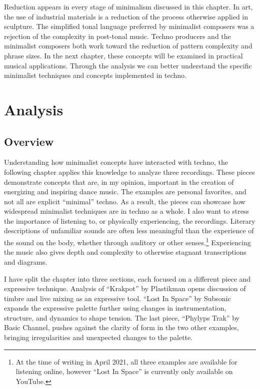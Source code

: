 \documentclass[12pt,twoside]{reedthesis}
\begin{document}
Reduction appears in every stage of minimalism discussed in this chapter. In art, the use of industrial materials is a reduction of the process otherwise applied in sculpture. The simplified tonal language preferred by minimalist composers was a rejection of the complexity in post-tonal music. Techno producers and the minimalist composers both work toward the reduction of pattern complexity and phrase sizes. In the next chapter, these concepts will be examined in practical musical applications. Through the analysis we can better understand the specific minimalist techniques and concepts implemented in techno.

\chapter{Analysis}

\section{Overview}

Understanding how minimalist concepts have interacted with techno, the following chapter applies this knowledge to analyze three recordings. These pieces demonstrate concepts that are, in my opinion, important in the creation of energizing and inspiring dance music. The examples are personal favorites, and not all are explicit ``minimal'' techno. As a result, the pieces can showcase how widespread minimalist techniques are in techno as a whole. I also want to stress the importance of listening to, or physically experiencing, the recordings. Literary descriptions of unfamiliar sounds are often less meaningful than the experience of the sound on the body, whether through auditory or other senses.\footnote{At the time of writing in April 2021, all three examples are available for listening online, however ``Lost In Space'' is currently only available on YouTube.} Experiencing the music also gives depth and complexity to otherwise stagnant transcriptions and diagrams.

I have split the chapter into three sections, each focused on a different piece and expressive technique. Analysis of ``Krakpot'' by Plastikman opens discussion of timbre and live mixing as an expressive tool. ``Lost In Space'' by Subsonic expands the expressive palette further using changes in instrumentation, structure, and dynamics to shape tension. The last piece, ``Phylyps Trak'' by Basic Channel, pushes against the clarity of form in the two other examples, bringing irregularities and unexpected changes to the palette.
\end{document}
